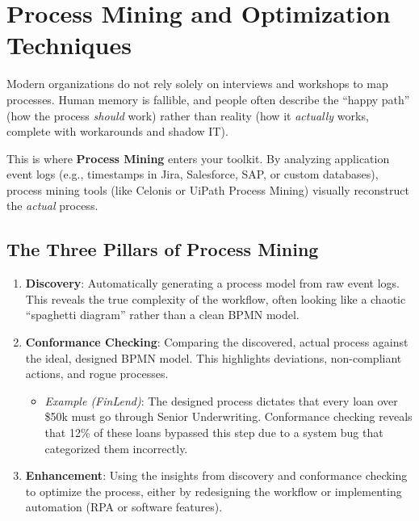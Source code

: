 \bigskip

\section{Process Mining and Optimization
Techniques}\label{process-mining-and-optimization-techniques}

Modern organizations do not rely solely on interviews and workshops to
map processes. Human memory is fallible, and people often describe the
``happy path'' (how the process \emph{should} work) rather than reality
(how it \emph{actually} works, complete with workarounds and shadow IT).

This is where \textbf{Process Mining} enters your toolkit. By analyzing
application event logs (e.g., timestamps in Jira, Salesforce, SAP, or
custom databases), process mining tools (like Celonis or UiPath Process
Mining) visually reconstruct the \emph{actual} process.

\subsection{The Three Pillars of Process
Mining}\label{the-three-pillars-of-process-mining}

\begin{enumerate}
\def\labelenumi{\arabic{enumi}.}
\tightlist
\item
  \textbf{Discovery}: Automatically generating a process model from raw
  event logs. This reveals the true complexity of the workflow, often
  looking like a chaotic ``spaghetti diagram'' rather than a clean BPMN
  model.
\item
  \textbf{Conformance Checking}: Comparing the discovered, actual
  process against the ideal, designed BPMN model. This highlights
  deviations, non-compliant actions, and rogue processes.

  \begin{itemize}
  \tightlist
  \item
    \emph{Example (FinLend)}: The designed process dictates that every
    loan over \$50k must go through Senior Underwriting. Conformance
    checking reveals that 12\% of these loans bypassed this step due to
    a system bug that categorized them incorrectly.
  \end{itemize}
\item
  \textbf{Enhancement}: Using the insights from discovery and
  conformance checking to optimize the process, either by redesigning
  the workflow or implementing automation (RPA or software features).
\end{enumerate}

